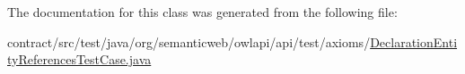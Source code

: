 The documentation for this class was generated from the following file\-:\begin{DoxyCompactItemize}
\item 
contract/src/test/java/org/semanticweb/owlapi/api/test/axioms/\hyperlink{_declaration_entity_references_test_case_8java}{Declaration\-Entity\-References\-Test\-Case.\-java}\end{DoxyCompactItemize}
